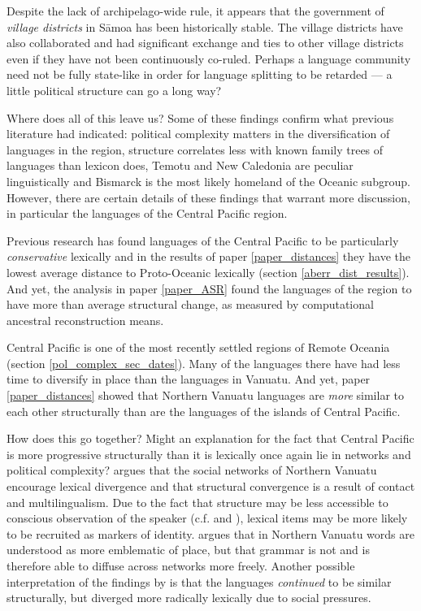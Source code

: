 \documentclass[a4paper,10pt]{article} %
\begin{document}
Despite the lack of archipelago-wide rule, it appears that the government of \emph{village districts} in S\={a}moa has been historically stable. The village districts have also collaborated and had significant exchange and ties to other village districts even if they have not been continuously co-ruled. Perhaps a language community need not be fully state-like in order for language splitting to be retarded --- a little political structure can go a long way?

Where does all of this leave us? Some of these findings confirm what previous literature had indicated: political complexity matters in the diversification of languages in the region, structure correlates less with known family trees of languages than lexicon does, Temotu and New Caledonia are peculiar linguistically and Bismarck is the most likely homeland of the Oceanic subgroup. However, there are certain details of these findings that warrant more discussion, in particular the languages of the Central Pacific region.

Previous research has found languages of the Central Pacific to be particularly \emph{conservative} lexically \citep[323]{blust2000lexicostatistics} and in the results of paper \ref{paper_distances} they have the lowest average distance to Proto-Oceanic lexically (section \ref{aberr_dist_results}). And yet, the analysis in paper \ref{paper_ASR} found the languages of the region to have more than average structural change, as measured by computational ancestral reconstruction means. 

Central Pacific is one of the most recently settled regions of Remote Oceania (section \ref{pol_complex_sec_dates}). Many of the languages there have had less time to diversify in place than the languages in Vanuatu. And yet, paper \ref{paper_distances} showed that Northern Vanuatu languages are \emph{more} similar to each other structurally than are the languages of the islands of Central Pacific. 

How does this go together? Might an explanation for the fact that Central Pacific is more progressive structurally than it is lexically once again lie in networks and political complexity? \cite{francois2011} argues that the social networks of Northern Vanuatu encourage lexical divergence and that structural convergence is a result of contact and multilingualism. Due to the fact that structure may be less accessible to conscious observation of the speaker (c.f. \citet{silverstein1981limits} and \citet[237-238]{pawley2006explaining}), lexical items may be more likely to be recruited as markers of identity. \cite{francois2011} argues that in Northern Vanuatu words are understood as more emblematic of place, but that grammar is not and is therefore able to diffuse across networks more freely. Another possible interpretation of the findings by \cite{francois2011} is that the languages \emph{continued} to be similar structurally, but diverged more radically lexically due to social pressures.
\end{document}

